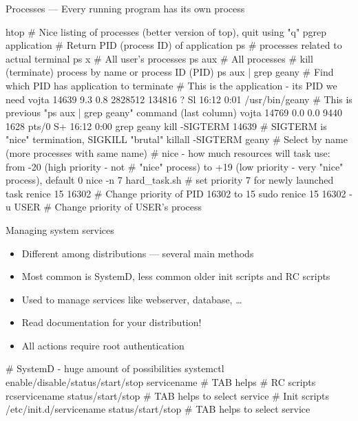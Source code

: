 \documentclass[compress, ucs, xelatex, 11pt, xcolor=svgnames,
  hyperref={
    bookmarks=true,
    unicode=true,
    colorlinks=true,
    pdftitle={Linux, command line and MetaCentrum},
    plainpages=false,
    pdfauthor={Vojtech Zeisek},
    pdfsubject={Course about use of Linux command line, writing shell scripts and using MetaCentrum of CESNET},
    pdfcreator={XeLaTeX, http://www.xelatex.org/},
    pdfkeywords={Linux, GNU, BASH, shell, command line, MetaCentrum},
    linkcolor=Sienna,
    anchorcolor=black,
    citecolor=green,
    filecolor=magenta,
    menucolor=Sienna,
    urlcolor=cyan,
    pdftex},
  url={hyphens, lowtilde} %
  ]{beamer}
\begin{document}
\begin{frame}[fragile]{Processes --- Every running program has its own process}
  \begin{bashcode}
    htop # Nice listing of processes (better version of top), quit using "q"
    pgrep application # Return PID (process ID) of application
    ps # processes related to actual terminal
    ps x # All user's processes
    ps aux # All processes
    # kill (terminate) process by name or process ID (PID)
    ps aux | grep geany # Find which PID has application to terminate
    # This is the application - its PID we need
    vojta 14639 9.3 0.8 2828512 134816 ?   Sl 16:12 0:01 /usr/bin/geany
    # This is previous "ps aux | grep geany" command (last column)
    vojta 14769 0.0 0.0   9440  1628 pts/0 S+ 16:12 0:00 grep geany
    kill -SIGTERM 14639 # SIGTERM is "nice" termination, SIGKILL "brutal"
    killall -SIGTERM geany # Select by name (more processes with same name)
    # nice - how much resources will task use: from -20 (high priority - not
    # "nice" process) to +19 (low priority - very "nice" process), default 0
    nice -n 7 hard_task.sh # set priority 7 for newly launched task
    renice 15 16302 # Change priority of PID 16302 to 15
    sudo renice 15 16302 -u USER # Change priority of USER's process
  \end{bashcode}
\end{frame}

\begin{frame}[fragile]{Managing system services}
\begin{itemize}
  \item Different among distributions --- several main methods
  \item Most common is SystemD, less common older init scripts and RC scripts
  \item Used to manage services like webserver, database, \ldots
  \item \alert{Read documentation for your distribution!}
  \item All actions require root authentication
\end{itemize}
  \begin{bashcode}
    # SystemD - huge amount of possibilities
    systemctl enable/disable/status/start/stop servicename # TAB helps
    # RC scripts
    rcservicename status/start/stop # TAB helps to select service
    # Init scripts
    /etc/init.d/servicename status/start/stop # TAB helps to select service
  \end{bashcode}
\end{frame}
\end{document}
